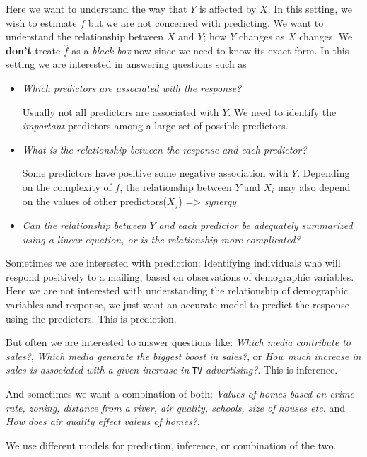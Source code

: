 \documentclass[
  letterpaper,
  DIV=11,
  numbers=noendperiod]{scrreprt}
\begin{document}
Here we want to understand the way that \(Y\) is affected by \(X\). In
this setting, we wish to estimate \(f\) but we are not concerned with
predicting. We want to understand the relationship between \(X\) and
\(Y\); how \(Y\) changes as \(X\) changes. We \textbf{don't} treate
\(\hat{f}\) as a \emph{black box} now since we need to know its exact
form. In this setting we are interested in answering questions such as

\begin{itemize}
\item
  \emph{Which predictors are associated with the response?}

  Usually not all predictors are associated with \(Y\). We need to
  identify the \emph{important} predictors among a large set of possible
  predictors.
\item
  \emph{What is the relationship between the response and each
  predictor?}

  Some predictors have positive some negative association with \(Y\).
  Depending on the complexity of \(f\), the relationship between \(Y\)
  and \(X_i\) may also depend on the values of other predictors(\(X_j\))
  =\textgreater{} \emph{synergy}
\item
  \emph{Can the relationship between} \(Y\) \emph{and each predictor be
  adequately summarized using a linear equation, or is the relationship
  more complicated?}
\end{itemize}

Sometimes we are interested with prediction: Identifying individuals who
will respond positively to a mailing, based on observations of
demographic variables. Here we are not interested with understanding the
relationship of demographic variables and response, we just want an
accurate model to predict the response using the predictors. This is
prediction.

But often we are interested to answer questions like: \emph{Which media
contribute to sales?}, \emph{Which media generate the biggest boost in
sales?}, or \emph{How much increase in sales is associated with a given
increase in} \texttt{TV} \emph{advertising?}. This is inference.

And sometimes we want a combination of both: \emph{Values of homes based
on crime rate, zoning, distance from a river, air quality, schools, size
of houses etc.} and \emph{How does air quality effect valeus of homes?}.

We use different models for prediction, inference, or combination of the
two.
\end{document}
